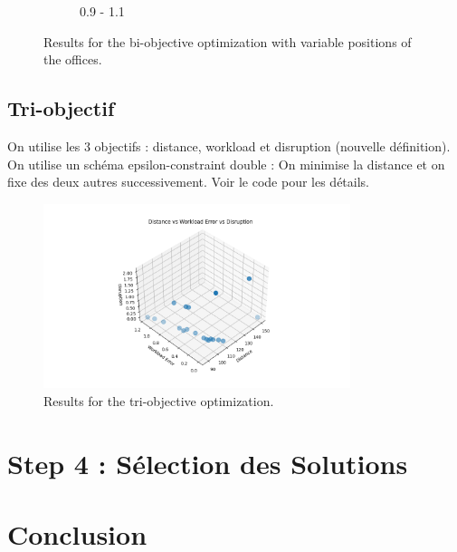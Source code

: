 \documentclass[12pt,a4paper]{article}
\begin{document}
\begin{figure}[H]
\begin{subfigure}{0.32\textwidth}
        \caption{0.9 - 1.1}
        \label{fig:solve3}
    \end{subfigure}
    \caption{Results for the bi-objective optimization with variable positions of the offices.}
    \label{fig:all_solves}
\end{figure}

\subsection*{Tri-objectif}
On utilise les 3 objectifs : distance, workload et disruption (nouvelle définition). On utilise un schéma epsilon-constraint double : On minimise la distance et on fixe des deux autres successivement. Voir le code pour les détails.

\begin{figure}[H]
    \centering
    \includegraphics[width=0.8\textwidth]{figures/solve5.png}
    \caption{Results for the tri-objective optimization.}
    \label{fig:solve2}
\end{figure}

\section*{Step 4 : Sélection des Solutions}


\section*{Conclusion}
\end{document}
